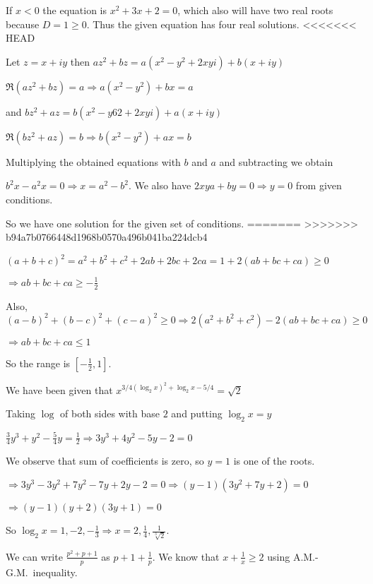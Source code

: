   If $x < 0$ the equation is $x^2 + 3x + 2 = 0$, which also will have two real roots because $D = 1 \geq 0$.
  Thus the given equation has four real solutions.
<<<<<<< HEAD
\item Let $z = x + iy$ then $az^2 + bz = a\left(x^2 - y^2 + 2xyi\right) + b(x + iy)$

  $\Re\left(az^2 + bz\right) = a \Rightarrow a\left(x^2 - y^2\right) + bx = a$

  and $bz^2 + az = b\left(x^2 - y62 + 2xyi\right) + a(x + iy)$

  $\Re\left(bz^2 + az\right) = b \Rightarrow b\left(x^2 - y^2\right) + ax = b$

  Multiplying the obtained equations with $b$ and $a$ and subtracting we obtain

  $b^2x - a^2x = 0 \Rightarrow x = a^2 - b^2$. We also have $2xya + by = 0 \Rightarrow y = 0$ from given
  conditions.

  So we have one solution for the given set of conditions.
=======
>>>>>>> b94a7b0766448d1968b0570a496b041ba224dcb4
\item $(a + b + c)^2 = a^2 + b^2 + c^2 + 2ab + 2bc + 2ca = 1 + 2(ab + bc + ca)\geq 0$

  $\Rightarrow ab + bc + ca\geq -\frac{1}{2}$

  Also, $(a - b)^2 + (b - c)^2 + (c - a)^2\geq 0 \Rightarrow 2\left(a^2 + b^2 + c^2\right) - 2(ab + bc +
  ca)\geq 0$

  $\Rightarrow ab + bc + ca \leq 1$

  So the range is $\left[-\frac{1}{2}, 1\right]$.
\item We have been given that $x^{3/4\left(\log_2x\right)^2 + \log_2x - 5/4} = \sqrt{2}$

  Taking $\log$ of both sides with base $2$ and putting $\log_2x = y$

  $\frac{3}{4}y^3 + y^2 - \frac{5}{4}y = \frac{1}{2}\Rightarrow 3y^3 + 4y^2 - 5y - 2 = 0$

  We observe that sum of coefficients is zero, so $y = 1$ is one of the roots.

  $\Rightarrow 3y^3 - 3y^2 + 7y^2 - 7y + 2y - 2 = 0\Rightarrow (y - 1)\left(3y^2 + 7y + 2\right) = 0$

  $\Rightarrow (y - 1)(y + 2)(3y + 1) = 0$

  So $\log_2x = 1, -2, -\frac{1}{3}\Rightarrow x = 2, \frac{1}{4}, \frac{1}{\sqrt[3]{2}}$.
\item We can write $\frac{p^2 + p + 1}{p}$ as $p + 1 + \frac{1}{p}$. We know that $x + \frac{1}{x}\geq 2$
  using A.M.-G.M.\ inequality.

